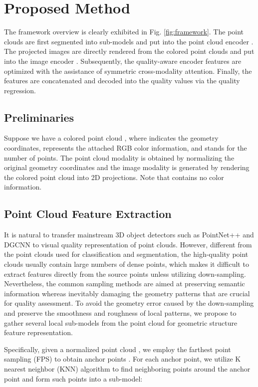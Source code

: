 \documentclass{article}
\begin{document}
\section{Proposed Method}
The framework overview is clearly exhibited in Fig. \ref{fig:framework}. The point clouds are first segmented into sub-models and put into the point cloud encoder . The projected images are directly rendered from the colored point clouds and put into the image encoder . Subsequently, the quality-aware encoder features are optimized with the assistance of symmetric cross-modality attention. Finally, the features are concatenated and decoded into the quality values via the quality regression. 

\subsection{Preliminaries} Suppose we have a colored point cloud , where  indicates the geometry coordinates,  represents the attached RGB color information, and  stands for the number of points.  The point cloud modality  is obtained by normalizing the original geometry coordinates and the image modality  is generated by rendering the colored point cloud  into 2D projections. Note that  contains no color information. 





\subsection{Point Cloud Feature Extraction}
\label{sec:pc}
It is natural to transfer mainstream 3D object detectors such as PointNet++ \cite{qi2017pointnet++} and DGCNN \cite{wang2019dynamic} to visual quality representation of point clouds. However, different from the point clouds used for classification and segmentation, the high-quality point clouds usually contain large numbers of dense points, which makes it difficult to extract features directly from the source points unless utilizing down-sampling. Nevertheless, the common sampling methods are aimed at preserving semantic information whereas inevitably damaging the geometry patterns that are crucial for quality assessment. To avoid the geometry error caused by the down-sampling and preserve the smoothness and roughness of local patterns, we propose to gather several local sub-models from the point cloud for geometric structure feature representation. 

Specifically, given a normalized point cloud , we employ the farthest point sampling (FPS) to obtain  anchor points . For each anchor point, we utilize K nearest neighbor (KNN) algorithm to find  neighboring points around the anchor point and form such points into a sub-model:
\end{document}
